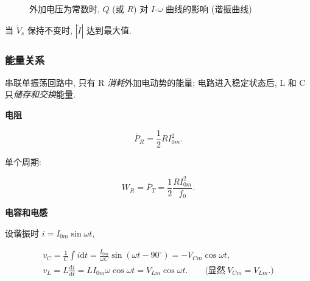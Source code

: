 \begin{figure}[H]
    \centering
    \caption{外加电压为常数时, $Q$ (或 $R$) 对 $I$-$\omega$ 曲线的影响 (谐振曲线)}
\end{figure}

当 $\dot{V}_s$ 保持不变时, $|\dot{I}|$ 达到最大值.

\subsubsection{能量关系} \label{能量关系}

串联单振荡回路中, 只有 R \textit{消耗}外加电动势的能量; 电路进入稳定状态后, L 和 C 只\textit{储存和交换}能量.

\textbf{电阻}

\begin{equation}
    \overline{P}_R=\frac{1}{2}RI_{0m}^2.
\end{equation}

单个周期:

\begin{equation}
    W_R=\overline{P}_T=\frac{1}{2}\frac{RI_{0m}^2}{f_0}.
\end{equation}

\textbf{电容和电感}

设谐振时 $i=I_{0m}\sin\omega t$,

\begin{equation*}
    \begin{gathered}
        v_C=\frac{1}{C}\int i\mathrm{d}t=\frac{I_{0m}}{\omega C}\sin(\omega t-90^\circ)=-V_{Cm}\cos\omega t, \\
        v_L=L\frac{\mathrm{d}i}{\mathrm{d}t}=LI_{0m}\omega\cos\omega t=V_{Lm}\cos\omega t.\qquad\textrm{(显然}\ V_{Cm}=V_{Lm}\textrm{.)}
    \end{gathered}
\end{equation*}

